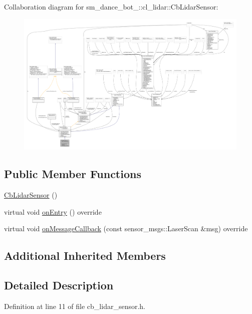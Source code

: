 Collaboration diagram for sm\+\_\+dance\+\_\+bot\+\_\+:\+:cl\+\_\+lidar\+:\+:Cb\+Lidar\+Sensor\+:\nopagebreak
\begin{figure}[H]
\begin{center}
\leavevmode
\includegraphics[width=350pt]{structsm__dance__bot__2_1_1cl__lidar_1_1CbLidarSensor__coll__graph}
\end{center}
\end{figure}
\subsection*{Public Member Functions}
\begin{DoxyCompactItemize}
\item 
\hyperlink{structsm__dance__bot__2_1_1cl__lidar_1_1CbLidarSensor_adefa67838fa6009639646c0478608ae3}{Cb\+Lidar\+Sensor} ()
\item 
virtual void \hyperlink{structsm__dance__bot__2_1_1cl__lidar_1_1CbLidarSensor_aad4085c114dd98c5e857d1a71c0309f8}{on\+Entry} () override
\item 
virtual void \hyperlink{structsm__dance__bot__2_1_1cl__lidar_1_1CbLidarSensor_a62e47011ef05a3d475da88c7c17a9861}{on\+Message\+Callback} (const sensor\+\_\+msgs\+::\+Laser\+Scan \&msg) override
\end{DoxyCompactItemize}
\subsection*{Additional Inherited Members}


\subsection{Detailed Description}


Definition at line 11 of file cb\+\_\+lidar\+\_\+sensor.\+h.



